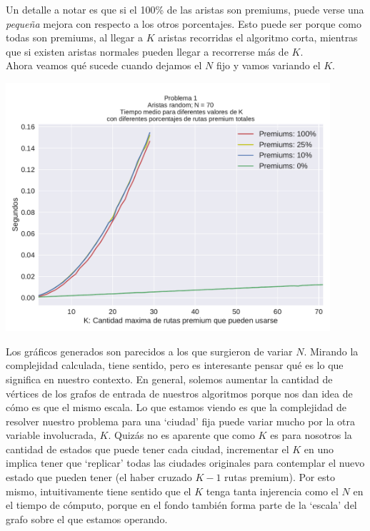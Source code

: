Un detalle a notar es que si el 100\% de las aristas son premiums, puede verse una \textit{pequeña} mejora con respecto a los otros porcentajes. Esto puede ser porque como todas son premiums, al llegar a $K$ aristas recorridas el algoritmo corta, mientras que si existen aristas normales pueden llegar a recorrerse más de $K$. \\

Ahora veamos qué sucede cuando dejamos el $N$ fijo y vamos variando el $K$.

{\centering
  \includegraphics[width=0.9\textwidth]{imagenes/problema1/nfijo.pdf} \\
}

Los gráficos generados son parecidos a los que surgieron de variar $N$. Mirando la complejidad calculada, tiene sentido, pero es interesante pensar qué es lo que significa en nuestro contexto. En general, solemos aumentar la cantidad de vértices de los grafos de entrada de nuestros algoritmos porque nos dan idea de cómo es que el mismo escala. Lo que estamos viendo es que la complejidad de resolver nuestro problema para una `ciudad' fija puede variar mucho por la otra variable involucrada, $K$. Quizás no es aparente que como $K$ es para nosotros la cantidad de estados que puede tener cada ciudad, incrementar el $K$ en uno implica tener que `replicar' todas las ciudades originales para contemplar el nuevo estado que pueden tener (el haber cruzado $K-1$ rutas premium). Por esto mismo, intuitivamente tiene sentido que el $K$ tenga tanta injerencia como el $N$ en el tiempo de cómputo, porque en el fondo también forma parte de la `escala' del grafo sobre el que estamos operando.